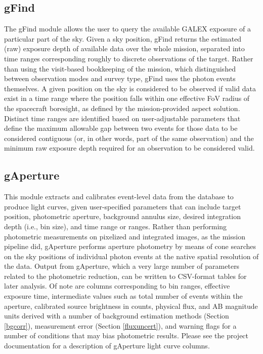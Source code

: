 \documentclass[trackchanges,preprint2]{aastex}
\begin{document}
\subsection{gFind}
\label{gfind}
The gFind module allows the user to query the available GALEX exposure of a particular part of the sky. Given a sky position, gFind returns the estimated (raw) exposure depth of available data over the whole mission, separated into time ranges corresponding roughly to discrete observations of the target. Rather than using the visit-based bookkeeping of the mission, which distinguished between observation modes and survey type, gFind uses the photon events themselves. A given position on the sky is considered to be observed if valid data exist in a time range where the position falls within one effective FoV radius of the spacecraft boresight, as defined by the mission-provided aspect solution. Distinct time ranges are identified based on user-adjustable parameters that define the maximum allowable gap between two events for those data to be considered contiguous (or, in other words, part of the same observation) and the minimum raw exposure depth required for an observation to be considered valid.

\subsection{gAperture}
This module extracts and calibrates event-level data from the database to produce light curves, given user-specified parameters that can include target position, photometric aperture, background annulus size, desired integration depth (i.e., bin size), and time range or ranges. Rather than performing photometric measurements on pixelized and integrated images, as the mission pipeline did, gAperture performs aperture photometry by means of cone searches on the sky positions of individual photon events at the native spatial resolution of the data.  Output from gAperture, which  a very large number of parameters related to the photometric reduction, can be written to CSV-format tables for later analysis. Of note are columns corresponding to  bin ranges, effective exposure time, intermediate values such as total number of events within the aperture, calibrated source brightness in counts, physical flux, and AB magnitude units derived with a number of background estimation methods (Section \ref{bgcorr}), measurement error (Section \ref{fluxuncert}), and warning flags for a number of conditions that may bias photometric results. Please see the project documentation for a description of gAperture light curve columns. 
\end{document}
